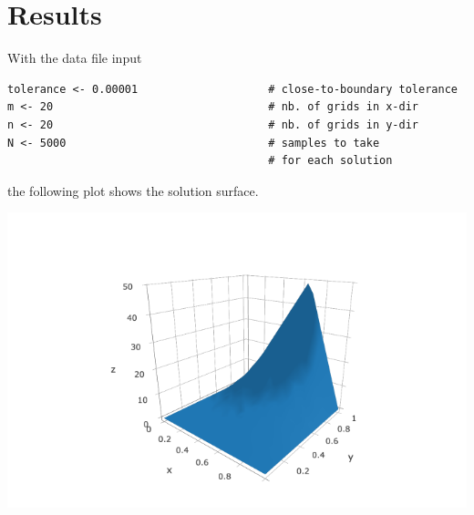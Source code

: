 \documentclass[11pt, reqno]{amsart}
\begin{document}
\section{Results}
\label{sec:org1198baa}
With the data file input
\begin{verbatim}
tolerance <- 0.00001                    # close-to-boundary tolerance
m <- 20                                 # nb. of grids in x-dir
n <- 20                                 # nb. of grids in y-dir
N <- 5000                               # samples to take
                                        # for each solution
\end{verbatim}
the following plot shows the solution surface.
\begin{center}
\includegraphics[width=.9\linewidth]{harmonic.png}
\end{center}
\end{document}
